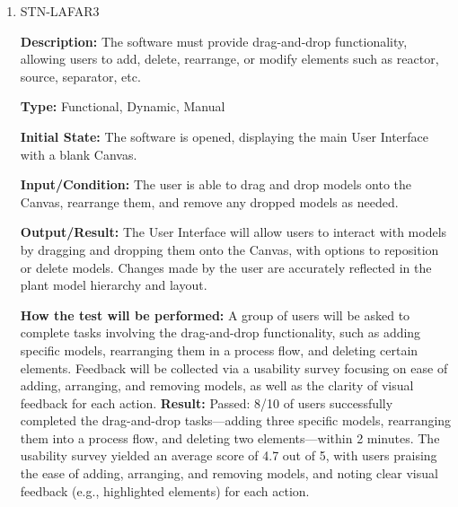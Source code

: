 \documentclass[12pt, titlepage]{article}
\begin{document}
\begin{enumerate}
\textbf{Type:} Functional, Dynamic, Manual

\textbf{Initial State:} The software is opened, displaying the main User Interface.

\textbf{Input/Condition:} The user is able to change the Canvas color between a light and dark theme.

\textbf{Output/Result:} The User Interface will reflect the selected theme (light or dark) across all elements. Specific color coding will apply to the models: input ports will be green, output ports will be red, and info ports will be blue.

\textbf{How the test will be performed:} Testers will evaluate the color scheme on multiple screens, ensuring adherence to the specified color guidelines and documenting any inconsistencies.

 \textbf{Result:} Passed: Testers confirmed that the color scheme adhered to the specified guidelines across five different screens (e.g., desktop, laptop, tablet), with consistent application of green for input ports, red for output ports, and blue for info ports. No inconsistencies were documented.

\item{STN-LAFAR3\\}

\textbf{Description:} The software must provide drag-and-drop functionality, allowing users to add, delete, rearrange, or modify elements such as reactor, source, separator, etc.

\textbf{Type:} Functional, Dynamic, Manual

\textbf{Initial State:} The software is opened, displaying the main User Interface with a blank Canvas.

\textbf{Input/Condition:} The user is able to drag and drop models onto the Canvas, rearrange them, and remove any dropped models as needed.

\textbf{Output/Result:} The User Interface will allow users to interact with models by dragging and dropping them onto the Canvas, with options to reposition or delete models. Changes made by the user are accurately reflected in the plant model hierarchy and layout.

\textbf{How the test will be performed:} A group of users will be asked to complete tasks involving the drag-and-drop functionality, such as adding specific models, rearranging them in a process flow, and deleting certain elements. Feedback will be collected via a usability survey focusing on ease of adding, arranging, and removing models, as well as the clarity of visual feedback for each action.
\textbf{Result:} Passed: 8/10 of users successfully completed the drag-and-drop tasks—adding three specific models, rearranging them into a process flow, and deleting two elements—within 2 minutes. The usability survey yielded an average score of 4.7 out of 5, with users praising the ease of adding, arranging, and removing models, and noting clear visual feedback (e.g., highlighted elements) for each action.

\end{enumerate}
\end{document}
